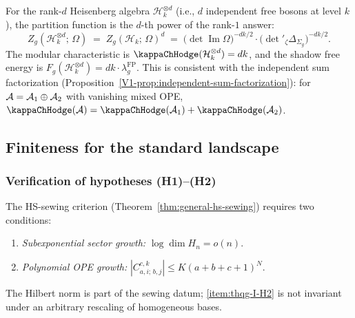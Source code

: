 \begin{remark}
For the rank-$d$ Heisenberg algebra $\mathcal{H}_k^{\otimes d}$ (i.e., $d$ independent free bosons at level $k$), the partition function is the $d$-th power of the rank-$1$ answer:
\begin{equation}%
Z_g(\mathcal{H}_k^{\otimes d};\,\Omega) \;=\; Z_g(\mathcal{H}_k;\,\Omega)^d \;=\; \bigl(\det\operatorname{Im}\Omega\bigr)^{-dk/2} \cdot \bigl(\det{}'_\zeta\Delta_{\Sigma_g}\bigr)^{-dk/2}.
\end{equation}
The modular characteristic is $\kappaChHodge(\mathcal{H}_k^{\otimes d}) = dk$, and the shadow free energy is $F_g(\mathcal{H}_k^{\otimes d}) = dk \cdot \lambda_g^{\mathrm{FP}}$. This is consistent with the independent sum factorization (Proposition~\ref{V1-prop:independent-sum-factorization}): for $\mathcal{A} = \mathcal{A}_1 \oplus \mathcal{A}_2$ with vanishing mixed OPE, $\kappaChHodge(\cA) = \kappaChHodge(\cA_1) + \kappaChHodge(\cA_2)$.
\end{remark}



\subsection{Finiteness for the standard landscape}
\label{subsec:thqg-I-standard-landscape}

\subsubsection{Verification of hypotheses (H1)--(H2)}

The HS-sewing criterion (Theorem~\ref{thm:general-hs-sewing}) requires two conditions:
\begin{enumerate}[label=\textbf{(H\arabic*)}]
\item \label{item:thqg-I-H1} \emph{Subexponential sector growth:} $\log \dim H_n = o(n)$.
\item \label{item:thqg-I-H2} \emph{Polynomial OPE growth:} $|C^{c,k}_{a,i;\,b,j}| \leq K(a+b+c+1)^N$.
\end{enumerate}
The Hilbert norm is part of the sewing datum; \ref{item:thqg-I-H2}
is not invariant under an arbitrary rescaling of homogeneous bases.

